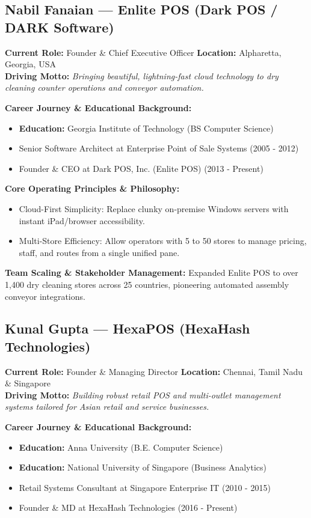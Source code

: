 \documentclass[11pt,a4paper]{article}
\begin{document}
\subsection{Nabil Fanaian --- Enlite POS (Dark POS / DARK Software)}
\textbf{Current Role:} Founder \& Chief Executive Officer \quad \textbf{Location:} Alpharetta, Georgia, USA\\
\textbf{Driving Motto:} \textit{Bringing beautiful, lightning-fast cloud technology to dry cleaning counter operations and conveyor automation.}

\textbf{Career Journey \& Educational Background:}
\begin{itemize}[leftmargin=*]
    \item \textbf{Education:} Georgia Institute of Technology (BS Computer Science)
    \item Senior Software Architect at Enterprise Point of Sale Systems (2005 - 2012)
    \item Founder \& CEO at Dark POS, Inc. (Enlite POS) (2013 - Present)
\end{itemize}

\textbf{Core Operating Principles \& Philosophy:}
\begin{itemize}[leftmargin=*]
    \item Cloud-First Simplicity: Replace clunky on-premise Windows servers with instant iPad/browser accessibility.
    \item Multi-Store Efficiency: Allow operators with 5 to 50 stores to manage pricing, staff, and routes from a single unified pane.
\end{itemize}

\textbf{Team Scaling \& Stakeholder Management:} Expanded Enlite POS to over 1,400 dry cleaning stores across 25 countries, pioneering automated assembly conveyor integrations.

\subsection{Kunal Gupta --- HexaPOS (HexaHash Technologies)}
\textbf{Current Role:} Founder \& Managing Director \quad \textbf{Location:} Chennai, Tamil Nadu \& Singapore\\
\textbf{Driving Motto:} \textit{Building robust retail POS and multi-outlet management systems tailored for Asian retail and service businesses.}

\textbf{Career Journey \& Educational Background:}
\begin{itemize}[leftmargin=*]
    \item \textbf{Education:} Anna University (B.E. Computer Science)
    \item \textbf{Education:} National University of Singapore (Business Analytics)
    \item Retail Systems Consultant at Singapore Enterprise IT (2010 - 2015)
    \item Founder \& MD at HexaHash Technologies (2016 - Present)
\end{itemize}
\end{document}
